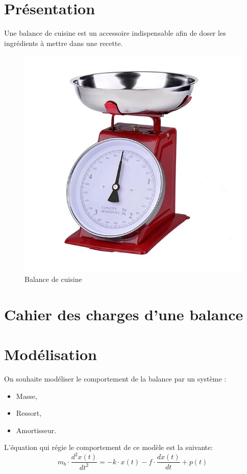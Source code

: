 

\section{Présentation}

Une balance de cuisine est un accessoire indispensable afin de doser les ingrédients à mettre dans une recette.

\begin{figure}[ht!]
\begin{center}
 \includegraphics[width=0.4\linewidth]{img/balance}
\end{center}
\caption{\label{fig01} Balance de cuisine}
\end{figure}

\section{Cahier des charges d'une balance}



\section{Modélisation}

On souhaite modéliser le comportement de la balance par un système :
\begin{itemize}
 \item Masse,
 \item Ressort,
 \item Amortisseur.
\end{itemize}

L'équation qui régie le comportement de ce modèle est la suivante:
\begin{equation}
m_b\cdot \dfrac{d^2 x(t)}{dt^2}=-k\cdot x(t)-f\cdot\dfrac{dx(t)}{dt}+p(t)
\end{equation}

